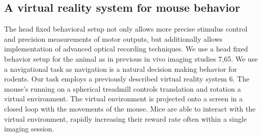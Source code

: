 \subsection{A virtual reality system for mouse behavior}
The head fixed behavioral setup not only allows more precise stimulus control and precision measurements of motor outputs, but additionally allows implementation of advanced optical recording techniques. We use a head fixed behavior setup for the animal as in previous in vivo imaging studies 7,65. We use a navigational task as navigation is a natural decision making behavior for rodents. Our task employs a previously described virtual reality system 6. The mouse's running on a spherical treadmill controls translation and rotation a virtual environment. The virtual environment is projected onto a screen in a closed loop with the movements of the mouse. Mice are able to interact with the virtual environment, rapidly increasing their reward rate often within a single imaging session.

